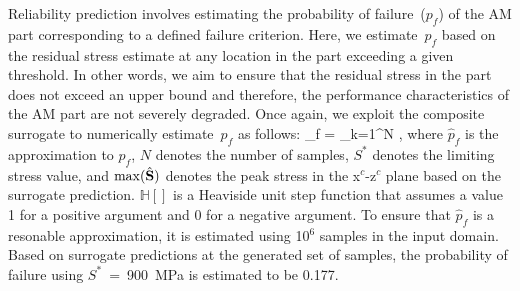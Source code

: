Reliability prediction involves estimating the probability of failure~($p_f$) of the AM part
corresponding to a defined failure criterion. Here, we estimate~$p_f$ based on the residual 
stress estimate at any location in
the part exceeding a given threshold. In other words, we aim to ensure that the residual stress
in the part does not exceed an upper bound and therefore, the performance characteristics of
the AM part are not severely degraded. Once again, we exploit the composite surrogate to
numerically estimate~$p_f$ as follows:
%
\be
{}_f = \sum\limits_{k=1}^{N} ,
\ee
\label{eq:pf}
%
where $\hat{p}_f$ is the approximation to $p_f$, $N$ denotes the number of samples, $S^\ast$
denotes the limiting stress value, and $\max(\hat{\mathbf{{S}}})$ denotes the peak stress in the
x$^c$-z$^c$ plane based on the surrogate prediction. $\mathbb{H}[]$
is a Heaviside unit step function that assumes a value 1 for a positive argument and 0 for
a negative argument.
To ensure that $\hat{p}_f$ is a resonable approximation, it is estimated
using 10$^6$ samples in the input domain. Based on surrogate predictions at the generated set of samples,
the probability of failure using $S^\ast$~=~900~MPa is estimated to be 0.177. 


















































 
